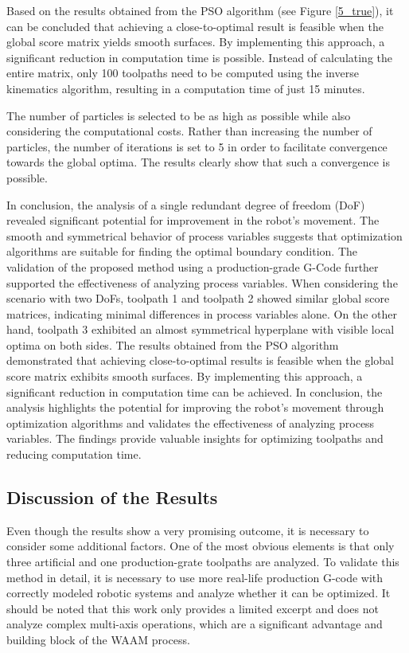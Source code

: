 Based on the results obtained from the \acrshort{PSO} algorithm (see Figure \ref{5_true}), it can be concluded that achieving a close-to-optimal result is feasible when the global score matrix yields smooth surfaces. By implementing this approach, a significant reduction in computation time is possible. Instead of calculating the entire matrix, only 100 toolpaths need to be computed using the inverse kinematics algorithm, resulting in a computation time of just 15 minutes.

The number of particles is selected to be as high as possible while also considering the computational costs. Rather than increasing the number of particles, the number of iterations is set to 5 in order to facilitate convergence towards the global optima. The results clearly show that such a convergence is possible.







In conclusion, the analysis of a single redundant degree of freedom (DoF) revealed significant potential for improvement in the robot's movement. The smooth and symmetrical behavior of process variables suggests that optimization algorithms are suitable for finding the optimal boundary condition. The validation of the proposed method using a production-grade G-Code further supported the effectiveness of analyzing process variables.
When considering the scenario with two DoFs, toolpath 1 and toolpath 2 showed similar global score matrices, indicating minimal differences in process variables alone. On the other hand, toolpath 3 exhibited an almost symmetrical hyperplane with visible local optima on both sides.
The results obtained from the PSO algorithm demonstrated that achieving close-to-optimal results is feasible when the global score matrix exhibits smooth surfaces. By implementing this approach, a significant reduction in computation time can be achieved.
In conclusion, the analysis highlights the potential for improving the robot's movement through optimization algorithms and validates the effectiveness of analyzing process variables. The findings provide valuable insights for optimizing toolpaths and reducing computation time.


\subsection{Discussion of the Results}%


Even though the results show a very promising outcome, it is necessary to consider some additional factors. One of the most obvious elements is that only three artificial and one production-grate toolpaths are analyzed. To validate this method in detail, it is necessary to use more real-life production G-code with correctly modeled robotic systems and analyze whether it can be optimized. It should be noted that this work only provides a limited excerpt and does not analyze complex multi-axis operations, which are a significant advantage and building block of the \acrshort{WAAM} process.

